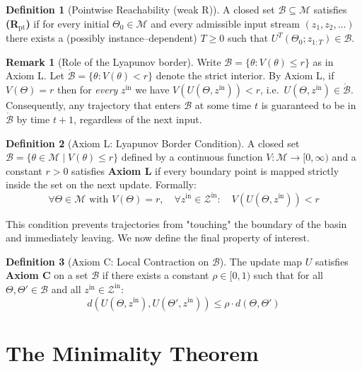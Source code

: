 \documentclass[12pt]{article}
\theoremstyle{definition}
\newtheorem{definition}{Definition}[section]
\newtheorem{remark}{Remark}[section]
\theoremstyle{plain}
\begin{document}
\begin{definition}[Pointwise Reachability (weak R)]
\label{def:basin-axiom-R}
A closed set $\mathcal B\subseteq\mathcal M$ satisfies \textbf{(R$_{\mathrm{pt}}$)} if for every initial
$\Theta_0\in\mathcal M$ and every admissible input stream $(z_1,z_2,\dots)$
there exists a (possibly instance–dependent) $T\ge0$ such that
$U^T(\Theta_0;z_{1:T})\in\mathcal B$.
\end{definition}

\begin{remark}[Role of the Lyapunov border]
\label{rem:Lyap-border-interior}
Write $\mathcal B=\{\theta:V(\theta)\le r\}$ as in Axiom L. Let
$\mathring{\mathcal B}=\{\theta:V(\theta)<r\}$ denote the strict interior.
By Axiom L, if $V(\Theta)=r$ then for \emph{every} $z^{\mathrm{in}}$ we have
$V(U(\Theta,z^{\mathrm{in}}))<r$, i.e.\ $U(\Theta,z^{\mathrm{in}})\in\mathring{\mathcal B}$.
Consequently, any trajectory that enters $\mathcal B$ at some time $t$ is
guaranteed to be in $\mathring{\mathcal B}$ by time $t{+}1$, regardless of the next input.
\end{remark}

\begin{definition}[Axiom L: Lyapunov Border Condition]
\label{def:basin-axiom-L}
A closed set $\mathcal{B} = \{\theta \in \mathcal{M} \mid V(\theta) \le r\}$ defined by a continuous function $V: \mathcal{M} \to [0, \infty)$ and a constant $r > 0$ satisfies \textbf{Axiom L} if every boundary point is mapped strictly inside the set on the next update. Formally:
\[
\forall \Theta \in \mathcal{M} \text{ with } V(\Theta) = r, \quad \forall z^{\text{in}} \in \mathcal{Z}^{\text{in}}: \quad V(U(\Theta, z^{\text{in}})) < r
\]
\end{definition}

This condition prevents trajectories from "touching" the boundary of the basin and immediately leaving. We now define the final property of interest.

\begin{definition}[Axiom C: Local Contraction on $\mathcal{B}$]
\label{def:basin-axiom-C}
The update map $U$ satisfies \textbf{Axiom C} on a set $\mathcal{B}$ if there exists a constant $\rho \in [0, 1)$ such that for all $\Theta, \Theta' \in \mathcal{B}$ and all $z^{\text{in}} \in \mathcal{Z}^{\text{in}}$:
\[
d(U(\Theta, z^{\text{in}}), U(\Theta', z^{\text{in}})) \le \rho \cdot d(\Theta, \Theta')
\]
\end{definition}

\section{The Minimality Theorem}
\end{document}

